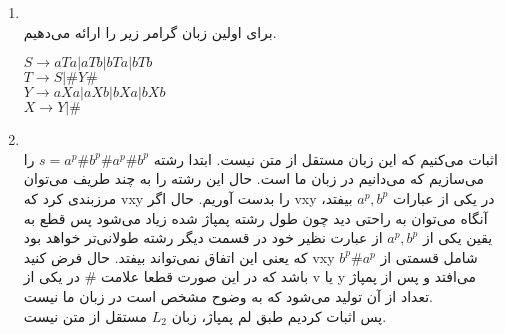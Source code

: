\begin{enumerate}
    \item \phantom{text}
          \\
          برای اولین زبان گرامر زیر را ارائه می‌دهیم.
          \\
          \begin{latin}
            $S \rightarrow aTa|aTb|bTa|bTb$\\
            $T \rightarrow S | \#Y\#$\\
            $Y \rightarrow aXa|aXb|bXa|bXb$\\
            $X\rightarrow Y|\#$
          \end{latin}
    \item \phantom{text}
    \\
    اثبات می‌کنیم که این زبان مستقل از متن نیست. ابتدا رشته $s=a^p\#b^p\#a^p\#b^p$ را می‌سازیم که می‌دانیم در زبان ما است.
    حال این رشته را به چند طریف می‌توان مرزبندی کرد که vxy را بدست آوریم.
    حال اگر vxy در یکی از عبارات $a^p,b^p$ بیفتد، آنگاه می‌توان به راحتی دید چون طول رشته پمپاژ شده زیاد می‌شود پس قطع به یقین یکی از $a^p,b^p$ از عبارت نظیر خود در قسمت دیگر رشته طولانی‌تر خواهد بود که یعنی این اتفاق نمی‌تواند بیفتد.
    حال فرض کنید vxy شامل قسمتی از $b^p\#a^p$ باشد که در این صورت قطعا علامت \# در یکی از v یا y می‌افتد و پس از پمپاژ تعداد از آن تولید می‌شود که به وضوح مشخص است در زبان ما نیست.\\
    پس اثبات کردیم طبق لم پمپاژ، زبان $L_2$ مستقل از متن نیست.
\end{enumerate}